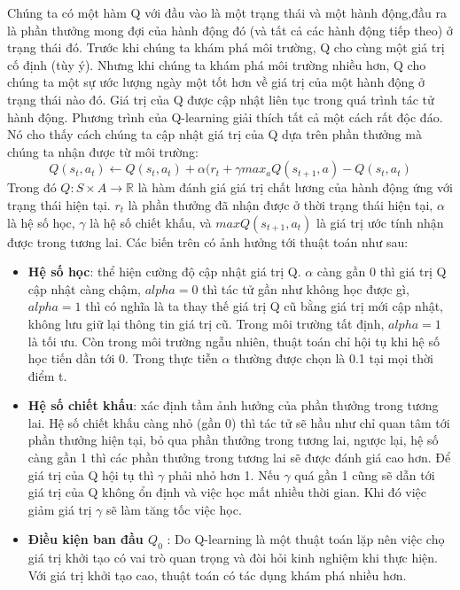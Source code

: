 \documentclass[14pt,a4paper,oneside]{report}		%
\begin{document}
Chúng ta có một hàm Q với đầu vào là một trạng thái và một hành động,đầu ra là phần thưởng mong đợi của hành động đó (và tất cả các hành động tiếp theo) ở trạng thái đó. Trước khi chúng ta khám phá môi trường, Q cho cùng một giá trị cố định (tùy ý). Nhưng khi chúng ta khám phá môi trường nhiều hơn, Q cho chúng ta một sự ước lượng ngày một tốt hơn về giá trị của một hành động ở trạng thái nào đó. Giá trị của Q được cập nhật liên tục trong quá trình tác tử hành động. 
	Phương trình của Q-learning giải thích tất cả một cách rất độc đáo. Nó cho thấy cách chúng ta cập nhật giá trị của Q dựa trên phần thưởng mà chúng ta nhận được từ môi trường:
\begin{equation}
Q(s_t,a_t) \leftarrow Q(s_t,a_t)+\alpha(r_t+\gamma max_{a}Q(s_{t+1},a) - Q(s_t,a_t)
\end{equation}
Trong đó $Q:S \times A \rightarrow \mathbb{R}$ là hàm đánh giá giá trị chất lương của hành động ứng với trạng thái hiện tại. $r_t$ là phần thưởng đã nhận được ở thời trạng thái hiện tại, $\alpha$ là hệ số học, $\gamma$ là hệ số chiết khấu, và $maxQ(s_{t+1},a_t)$ là giá trị ước tính nhận được trong tương lai. Các biến trên có ảnh hưởng tới thuật toán như sau:
\begin{itemize}
\item \textbf{Hệ số học}: thể hiện cường độ cập nhật giá trị Q. $\alpha$ càng gần 0 thì giá trị Q cập nhật càng chậm, $alpha = 0$ thì tác tử gần như không học được gì, $alpha = 1$ thì có nghĩa là ta thay thế giá trị Q cũ bằng giá trị mới cập nhật, không lưu giữ lại thông tin giá trị cũ. Trong môi trường tất định, $alpha=1$ là tối ưu. Còn trong môi trường ngẫu nhiên, thuật toán chỉ hội tụ khi hệ số học tiến dần tới 0. Trong thực tiễn $\alpha$ thường được chọn là 0.1 tại mọi thời điểm t.
\item \textbf{Hệ số chiết khấu}: xác định tầm ảnh hưởng của phần thưởng trong tương lai. Hệ số chiết khấu càng nhỏ (gần 0) thì tác tử sẽ hầu như chỉ quan tâm tới phần thưởng hiện tại, bỏ qua phần thưởng trong tương lai, ngược lại, hệ số càng gần 1 thì các phần thưởng trong tương lai sẽ được đánh giá cao hơn. Để giá trị của Q hội tụ thì $\gamma$ phải nhỏ hơn 1. Nếu $\gamma$ quá gần 1 cũng sẽ dẫn tới giá trị của Q không ổn định và việc học mất nhiều thời gian. Khi đó việc giảm giá trị $\gamma$ sẽ làm tăng tốc việc học.
\item \textbf{Điều kiện ban đầu $Q_0$} : Do Q-learning là một thuật toán lặp nên việc chọ giá trị khởi tạo có vai trò quan trọng và đòi hỏi kinh nghiệm khi thực hiện. Với giá trị khởi tạo cao, thuật toán có tác dụng khám phá nhiều hơn.
\end{itemize} 
\end{document}
